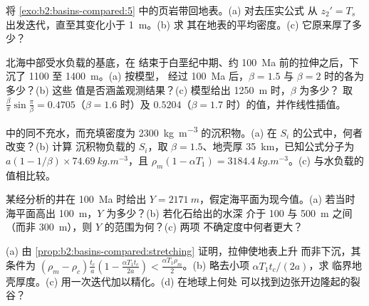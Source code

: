 \begin{exercise}[$\star\star$]\label{exo:b2:basins-compared:6}
将 \cref{exo:b2:basins-compared:5} 中的页岩带回地表。(a) 对去压实公式
从 $z_2' = T_s$ 出发迭代，直至其变化小于 \qty{1}{m}。(b) 求
其在地表的平均密度。(c) 它原来厚了多少？
\end{exercise}

\begin{exercise}[$\star\star$]\label{exo:b2:basins-compared:7}
北海中部受水负载的基底，在
结束于白垩纪中期、约 \qty{100}{Ma} 前的拉伸之后，下沉了 1100 至 \qty{1400}{m}。(a) 按模型，
经过 \qty{100}{Ma} 后，$\beta = 1.5$ 与 $\beta = 2$ 时的各为多少？(b) 这些
值是否涵盖观测结果？(c) 模型给出 \qty{1250}{m} 时，$\beta$ 为多少？
取 $\frac{\beta}{\pi}\sin\frac{\pi}{\beta} = 0.4705$（$\beta = 1.6$ 时）及 $0.5204$（$\beta
= 1.7$ 时）的值，并作线性插值。
\end{exercise}

\begin{exercise}[$\star\star$]\label{exo:b2:basins-compared:8}
中的同不充水，而充填密度为
\qty{2300}{kg.m^{-3}} 的沉积物。(a) 在 $S_i$ 的公式中，何者改变？(b) 计算
沉积物负载的 $S_i$，取 $\beta = 1.5$、地壳厚 \qty{35}{km}，已知公式分子为
$a(1 - 1/\beta)\times\qty{74.69}{kg.m^{-3}}$，且 $\rho_m(1 - \alpha T_1) =
\qty{3184.4}{kg.m^{-3}}$。(c) 与水负载的值相比较。
\end{exercise}

\begin{exercise}[$\star\star$]\label{exo:b2:basins-compared:9}
某经分析的井在 \qty{100}{Ma} 时给出 $Y = \qty{2171}{m}$，假定海平面为现今值。(a)
若当时海平面高出 \qty{100}{m}，$Y$ 为多少？(b) 若化石给出的水深
介于 100 与 \qty{500}{m} 之间（而非 \qty{300}{m}），则 $Y$ 的范围为何？(c) 两项
不确定度中何者更大？
\end{exercise}

\begin{exercise}[$\star\star\star$]\label{exo:b2:basins-compared:10}
(a) 由 \cref{prop:b2:basins-compared:stretching} 证明，拉伸使地表上升
而非下沉，其条件为 $(\rho_m - \rho_c)\frac{t_c}{a}\left(1 - \frac{\alpha T_1 t_c}{2a}\right) <
\frac{\alpha T_1\rho_m}{2}$。(b) 略去小项 $\alpha T_1 t_c/(2a)$，求
临界地壳厚度。(c) 用一次迭代加以精化。(d) 在地球上何处
可以找到边张开边隆起的裂谷？
\end{exercise}

